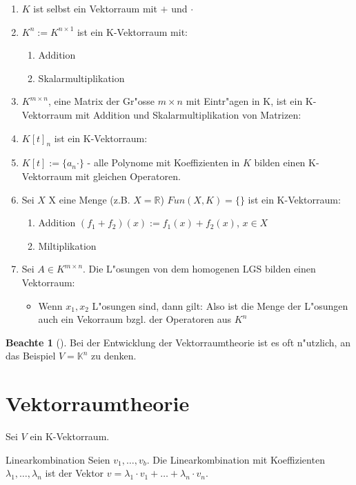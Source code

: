 \documentclass[oneside,fontsize=11pt,paper=a4,BCOR=0mm,DIV=12,automark,headsepline]{scrbook}
\theoremstyle{remark}
\theoremstyle{definition}
\newtheorem*{notte}{Beachte}
\theoremstyle{definition}
\theoremstyle{remark}
\begin{document}
\begin{exa}
  \begin{enumerate}
  \item \(K\) ist selbst ein Vektorraum mit \(+\) und \(\cdot\)
  \item \(K^{n}:=K^{n\times 1}\) ist ein K-Vektorraum mit:
    \begin{enumerate}
    \item Addition
    \item Skalarmultiplikation
    \end{enumerate}
  \item \(K^{m \times n}\), eine Matrix der Gr"osse \(m\times n\) mit Eintr"agen in K,
    ist ein K-Vektorraum mit Addition und Skalarmultiplikation von Matrizen:
  \item \(K[t]_n\) ist ein K-Vektorraum:
  \item \(K[t]:=\{a_n\cdot \}\) - alle Polynome mit Koeffizienten in \(K\) bilden einen
    K-Vektorraum mit gleichen Operatoren.
  \item Sei \(X\) X eine Menge (z.B. \(X=\mathbb{R}\)) \(Fun(X,K)=\{\}\) ist ein K-Vektorraum:
    \begin{enumerate}
    \item Addition \((f_1 + f_2)(x):= f_1(x)+ f_2(x)\), \(x\in X\)
    \item Miltiplikation
    \end{enumerate}
  \item Sei \(A\in K^{m\times n}\). Die L"osungen von dem homogenen LGS bilden einen
    Vektorraum:
    \begin{itemize}
    \item Wenn \(x_1,x_2\) L"osungen sind, dann gilt: Also ist die Menge der
      L"osungen auch ein Vekorraum bzgl. der Operatoren aus \(K^n\)
    \end{itemize}
  \end{enumerate}
\end{exa}

\begin{notte}[]
  Bei der Entwicklung der Vektorraumtheorie ist es oft n"utzlich, an das Beispiel
  \(V=\mathbb{K}^n\) zu denken.
\end{notte}

\chapter{Vektorraumtheorie}
\label{sec:org432e282}
Sei \(V\) ein K-Vektorraum.

\begin{definition}{Linearkombination}{}
  Seien \(v_1, \dots, v_b\). Die Linearkombination mit Koeffizienten $\lambda_1, \dots, \lambda_n$ ist der Vektor $v=\lambda_1\cdot v_1 + \dots + \lambda_n \cdot v_n$.
\end{definition}
\end{document}
